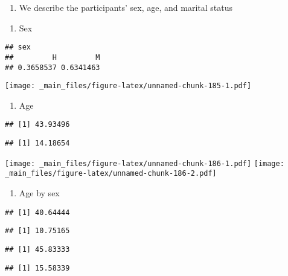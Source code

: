 \documentclass[
]{book}
\providecommand{\tightlist}{%
  \setlength{\itemsep}{0pt}\setlength{\parskip}{0pt}}
\begin{document}
\begin{enumerate}
\def\labelenumi{\arabic{enumi}.}
\tightlist
\item
  We describe the participants' sex, age, and marital status
\end{enumerate}

\begin{enumerate}
\def\labelenumi{\alph{enumi}.}
\tightlist
\item
  Sex
\end{enumerate}

\begin{verbatim}
## sex
##         H         M 
## 0.3658537 0.6341463
\end{verbatim}

\texttt{[image: \_main\_files/figure-latex/unnamed-chunk-185-1.pdf]}

\begin{enumerate}
\def\labelenumi{\alph{enumi}.}
\setcounter{enumi}{1}
\tightlist
\item
  Age
\end{enumerate}

\begin{verbatim}
## [1] 43.93496
\end{verbatim}

\begin{verbatim}
## [1] 14.18654
\end{verbatim}

\texttt{[image: \_main\_files/figure-latex/unnamed-chunk-186-1.pdf]} \texttt{[image: \_main\_files/figure-latex/unnamed-chunk-186-2.pdf]}

\begin{enumerate}
\def\labelenumi{\alph{enumi}.}
\setcounter{enumi}{2}
\tightlist
\item
  Age by sex
\end{enumerate}

\begin{verbatim}
## [1] 40.64444
\end{verbatim}

\begin{verbatim}
## [1] 10.75165
\end{verbatim}

\begin{verbatim}
## [1] 45.83333
\end{verbatim}

\begin{verbatim}
## [1] 15.58339
\end{verbatim}
\end{document}
